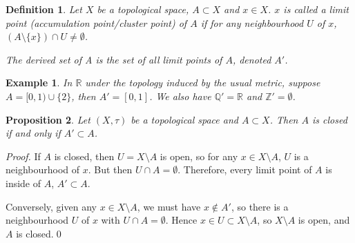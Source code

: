 \documentclass{article}
\theoremstyle{plain}\theoremheaderfont{\normalfont\itshape}\theorembodyfont{\rmfamily}\theoremseparator{.}\newtheorem*{rem}{Remark}\newtheorem*{ex}{Example}\newtheorem*{proof}{Proof}\newtheorem*{altp}{Alternative proof}
\theoremstyle{plain}\theoremheaderfont{\normalfont\bfseries}\theorembodyfont{\rmfamily}\theoremseparator{.}\newtheorem{thm}{Theorem}[section]\newtheorem{lem}[thm]{Lemma}\newtheorem{prop}[thm]{Proposition}\newtheorem*{cor}{Corollary}\newtheorem{defn}[thm]{Definition}\newtheorem{clm}[thm]{Claim}\newtheorem{clminproof}{Claim}
\theoremstyle{break}\theoremheaderfont{\normalfont\itshape}\theorembodyfont{\rmfamily}\theoremseparator{.\medskip}\newtheorem*{proofskip}{Proof}\newtheorem*{exs}{Examples}\newtheorem*{rems}{Remarks}
\theoremstyle{break}\theoremheaderfont{\normalfont\bfseries}\theorembodyfont{\rmfamily}\theoremseparator{.\medskip}\newtheorem{lemskip}[thm]{Lemma}\newtheorem{defnskip}[thm]{Definition}\newtheorem{propskip}[thm]{Proposition}\newtheorem{thmskip}[thm]{Theorem}
\newcommand{\qed}{\hfill\ensuremath{\Box}}
\begin{document}
    \begin{defn}
        Let \(X\) be a topological space, \(A\subset X\) and \(x\in X\). \(x\) is called a \textit{limit point} (\textit{accumulation point}/\textit{cluster point}) of \(A\) if for any neighbourhood \(U\) of \(x\), \((A\setminus\{x\})\cap U\ne\emptyset\).

        The \textit{derived set} of A is the set of all limit points of \(A\), denoted \(A'\).
    \end{defn}
    \begin{ex}
        In \(\mathbb{R}\) under the topology induced by the usual metric, suppose \(A=[0,1)\cup\{2\}\), then \(A'=[0,1]\). We also have \(\mathbb{Q}'=\mathbb{R}\) and \(\mathbb{Z}'=\emptyset\).
    \end{ex}

    \begin{prop}
        Let \((X,\tau)\) be a topological space and \(A\subset X\). Then \(A\) is closed if and only if \(A'\subset A\).
    \end{prop}
    \begin{proof}
        If \(A\) is closed, then \(U=X\setminus A\) is open, so for any \(x\in X\setminus A\), \(U\) is a neighbourhood of \(x\). But then \(U\cap A=\emptyset\). Therefore, every limit point of \(A\) is inside of \(A\), \(A'\subset A\).

        Conversely, given any \(x\in X\setminus A\), we must have \(x\not\in A'\), so there is a neighbourhood \(U\) of \(x\) with \(U\cap A=\emptyset\). Hence \(x\in U\subset X\setminus A\), so \(X\setminus A\) is open, and \(A\) is closed.\qed
    \end{proof}
\end{document}
